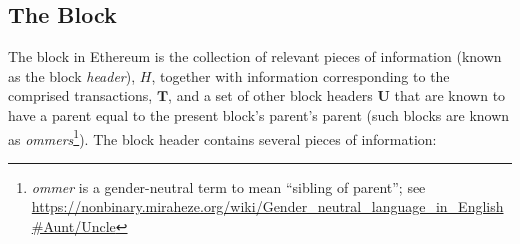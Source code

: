 \documentclass[9pt,oneside]{amsart}
\makeatletter
\newcommand{\linkdest}[1]{\Hy@raisedlink{\hypertarget{#1}{}}}
\makeatother
\begin{document}
\begin{multicols}{2}
\subsection{The Block}\linkdest{block}\label{subsec:The_Block}

The block in Ethereum is the collection of relevant pieces of information (known as the block \textit{header}), $H$, together with information corresponding to the comprised transactions, $\mathbf{T}$,\hypertarget{ommerheaders}{} and a set of other block headers $\mathbf{U}$ that are known to have a parent equal to the present block's parent's parent (such blocks are known as \textit{ommers}\footnote{\textit{ommer} is a gender-neutral term to mean ``sibling of parent''; see \url{https://nonbinary.miraheze.org/wiki/Gender_neutral_language_in_English\#Aunt/Uncle}}). The block header contains several pieces of information:



\end{multicols}
\end{document}
